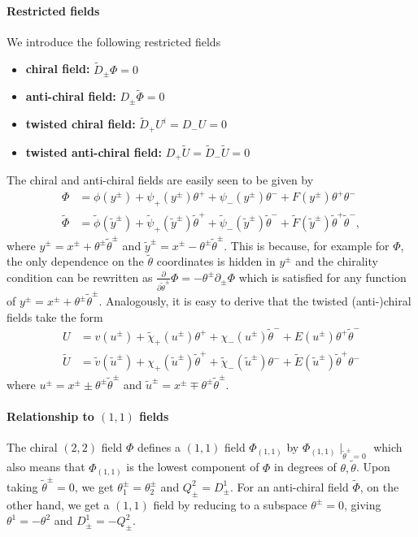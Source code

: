 \documentclass{article}
\newcommand{\p}{\partial}
\newcommand{\tth}{\tl{\theta}}
\def\tl{\tilde}
\theoremstyle{definition}
\theoremstyle{definition}
\theoremstyle{remark}
\begin{document}
\paragraph*{Restricted fields}
We introduce the following restricted fields
\begin{itemize}
\item {\bf chiral field:} $\tl{D}_\pm \Phi=0$
\item {\bf anti-chiral field:} $D_\pm \tl{\Phi}=0$
\item {\bf twisted chiral field:} $\tl{D}_+U^i=D_-U=0$
\item {\bf twisted anti-chiral field:} $D_+\tl{U}=\tl{D}_-\tl{U}=0$
\end{itemize}
The chiral and anti-chiral fields are easily seen to be given by
\begin{align*}
\Phi&=\phi(y^\pm)+\psi_+(y^\pm)\theta^++\psi_-(y^\pm)\theta^-+F(y^\pm)\theta^+\theta^-\\
\tl{\Phi}&=\tl{\phi}(\tl{y}^\pm)+\tl{\psi}_+(\tl{y}^\pm)\tth^++\tl{\psi}_-(\tl{y}^\pm)\tth^-+\tl{F}(\tl{y}^\pm)\tth^+\tth^-,
\end{align*}
where $y^\pm=x^\pm+\theta^\pm\tth^\pm$ and $\tl{y}^\pm=x^\pm-\theta^\pm\tth^\pm$. This is because, for example for $\Phi$, the only dependence on the $\tth$ coordinates is hidden in $y^\pm$ and the chirality condition can be rewritten as $\frac{\p}{\p \tth^\pm}\Phi=-\theta^\pm\p_\pm \Phi$ which is satisfied for any function of $y^\pm=x^\pm+\theta^\pm\tth^\pm$. Analogously, it is easy to derive that the twisted (anti-)chiral fields take the form
\begin{align*}
U&=v(u^\pm)+\tl{\chi}_+(u^\pm)\theta^++\chi_-(u^\pm)\tl{\theta}^-+E(u^\pm)\theta^+\tl{\theta}^-\\
\tl{U}&=\tl{v}(\tl{u}^\pm)+\chi_+(\tl{u}^\pm)\tl{\theta}^++\tl{\chi}_-(\tl{u}^\pm)\theta^-+\tl{E}(\tl{u}^\pm)\tl{\theta}^+\theta^-
\end{align*}
where $u^\pm=x^\pm\pm\theta^\pm\tth^\pm$ and $\tl{u}^\pm=x^\pm\mp\theta^\pm\tth^\pm$.

\paragraph*{Relationship to $(1,1)$ fields}
The chiral $(2,2)$ field $\Phi$ defines a $(1,1)$ field $\Phi_{(1,1)}$ by $\Phi_{(1,1)}\mid_{\tth^\pm=0}$ which also means that $\Phi_{(1,1)}$ is the lowest component of $\Phi$ in degrees of $\theta,\tth$. Upon taking $\tth^\pm=0$, we get $\theta_1^\pm=\theta_2^\pm$ and $Q^2_\pm=D^1_\pm$. For an anti-chiral field $\tl{\Phi}$, on the other hand, we get a $(1,1)$ field by reducing to a subspace $\theta^\pm=0$, giving $\theta^1=-\theta^2$ and $D^1_\pm=-Q^2_\pm$.
\end{document}
